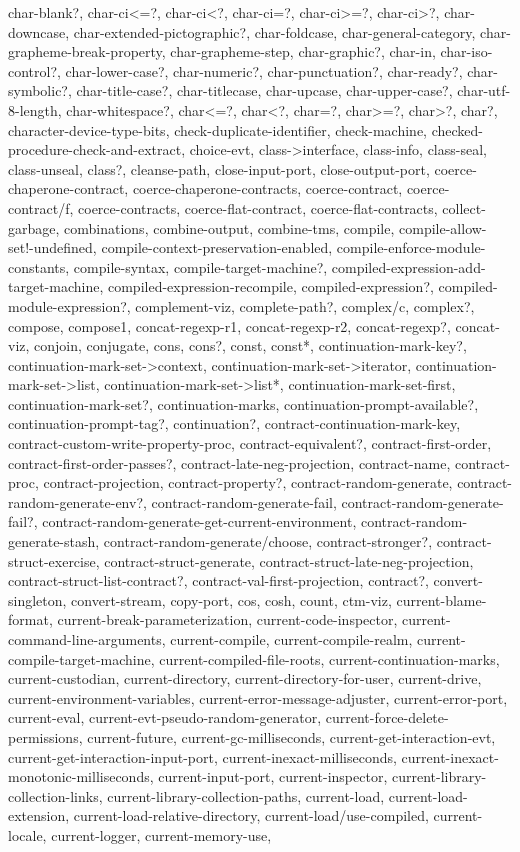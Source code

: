 {{char-blank?, char-ci<=?, char-ci<?, char-ci=?, char-ci>=?, char-ci>?, char-downcase, char-extended-pictographic?, char-foldcase, char-general-category, char-grapheme-break-property, char-grapheme-step, char-graphic?, char-in, char-iso-control?, char-lower-case?, char-numeric?, char-punctuation?, char-ready?, char-symbolic?, char-title-case?, char-titlecase, char-upcase, char-upper-case?, char-utf-8-length, char-whitespace?, char<=?, char<?, char=?, char>=?, char>?, char?, character-device-type-bits, check-duplicate-identifier, check-machine, checked-procedure-check-and-extract, choice-evt, class->interface, class-info, class-seal, class-unseal, class?, cleanse-path, close-input-port, close-output-port, coerce-chaperone-contract, coerce-chaperone-contracts, coerce-contract, coerce-contract/f, coerce-contracts, coerce-flat-contract, coerce-flat-contracts, collect-garbage, combinations, combine-output, combine-tms, compile, compile-allow-set!-undefined, compile-context-preservation-enabled, compile-enforce-module-constants, compile-syntax, compile-target-machine?, compiled-expression-add-target-machine, compiled-expression-recompile, compiled-expression?, compiled-module-expression?, complement-viz, complete-path?, complex/c, complex?, compose, compose1, concat-regexp-r1, concat-regexp-r2, concat-regexp?, concat-viz, conjoin, conjugate, cons, cons?, const, const*, continuation-mark-key?, continuation-mark-set->context, continuation-mark-set->iterator, continuation-mark-set->list, continuation-mark-set->list*, continuation-mark-set-first, continuation-mark-set?, continuation-marks, continuation-prompt-available?, continuation-prompt-tag?, continuation?, contract-continuation-mark-key, contract-custom-write-property-proc, contract-equivalent?, contract-first-order, contract-first-order-passes?, contract-late-neg-projection, contract-name, contract-proc, contract-projection, contract-property?, contract-random-generate, contract-random-generate-env?, contract-random-generate-fail, contract-random-generate-fail?, contract-random-generate-get-current-environment, contract-random-generate-stash, contract-random-generate/choose, contract-stronger?, contract-struct-exercise, contract-struct-generate, contract-struct-late-neg-projection, contract-struct-list-contract?, contract-val-first-projection, contract?, convert-singleton, convert-stream, copy-port, cos, cosh, count, ctm-viz, current-blame-format, current-break-parameterization, current-code-inspector, current-command-line-arguments, current-compile, current-compile-realm, current-compile-target-machine, current-compiled-file-roots, current-continuation-marks, current-custodian, current-directory, current-directory-for-user, current-drive, current-environment-variables, current-error-message-adjuster, current-error-port, current-eval, current-evt-pseudo-random-generator, current-force-delete-permissions, current-future, current-gc-milliseconds, current-get-interaction-evt, current-get-interaction-input-port, current-inexact-milliseconds, current-inexact-monotonic-milliseconds, current-input-port, current-inspector, current-library-collection-links, current-library-collection-paths, current-load, current-load-extension, current-load-relative-directory, current-load/use-compiled, current-locale, current-logger, current-memory-use, }}
